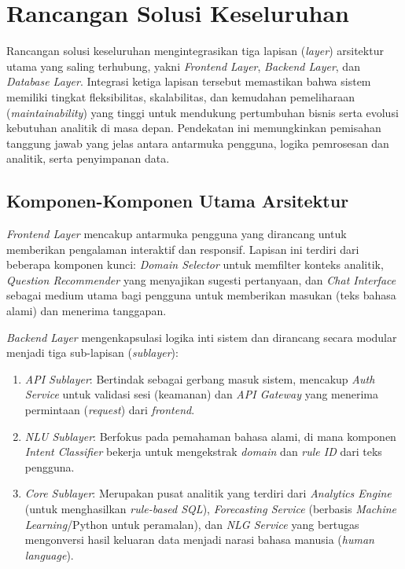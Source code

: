 \section{Rancangan Solusi Keseluruhan}
\label{sec:rancangan-solusi}

Rancangan solusi keseluruhan mengintegrasikan tiga lapisan (\textit{layer}) arsitektur utama yang saling terhubung, yakni \textit{Frontend Layer}, \textit{Backend Layer}, dan \textit{Database Layer}. Integrasi ketiga lapisan tersebut memastikan bahwa sistem memiliki tingkat fleksibilitas, skalabilitas, dan kemudahan pemeliharaan (\textit{maintainability}) yang tinggi untuk mendukung pertumbuhan bisnis serta evolusi kebutuhan analitik di masa depan. Pendekatan ini memungkinkan pemisahan tanggung jawab yang jelas antara antarmuka pengguna, logika pemrosesan dan analitik, serta penyimpanan data.

\subsection{Komponen-Komponen Utama Arsitektur}
\label{subsec:komponen-arsitektur}

\textit{Frontend Layer} mencakup antarmuka pengguna yang dirancang untuk memberikan pengalaman interaktif dan responsif. Lapisan ini terdiri dari beberapa komponen kunci: \textit{Domain Selector} untuk memfilter konteks analitik, \textit{Question Recommender} yang menyajikan sugesti pertanyaan, dan \textit{Chat Interface} sebagai medium utama bagi pengguna untuk memberikan masukan (teks bahasa alami) dan menerima tanggapan.

\textit{Backend Layer} mengenkapsulasi logika inti sistem dan dirancang secara modular menjadi tiga sub-lapisan (\textit{sublayer}):
\begin{enumerate}
    \item \textit{API Sublayer}: Bertindak sebagai gerbang masuk sistem, mencakup \textit{Auth Service} untuk validasi sesi (keamanan) dan \textit{API Gateway} yang menerima permintaan (\textit{request}) dari \textit{frontend}.
    \item \textit{NLU Sublayer}: Berfokus pada pemahaman bahasa alami, di mana komponen \textit{Intent Classifier} bekerja untuk mengekstrak \textit{domain} dan \textit{rule ID} dari teks pengguna.
    \item \textit{Core Sublayer}: Merupakan pusat analitik yang terdiri dari \textit{Analytics Engine} (untuk menghasilkan \textit{rule-based SQL}), \textit{Forecasting Service} (berbasis \textit{Machine Learning}/Python untuk peramalan), dan \textit{NLG Service} yang bertugas mengonversi hasil keluaran data menjadi narasi bahasa manusia (\textit{human language}).
\end{enumerate}


